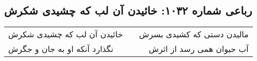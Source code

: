 \begin{center}
\section*{رباعی شماره ۱۰۳۲: خائیدن آن لب که چشیدی شکرش}
\label{sec:1032}
\begin{longtable}{l p{0.5cm} r}
خائیدن آن لب که چشیدی شکرش
&&
مالیدن دستی که کشیدی بسرش
\\
نگذارد آنکه او به جان و جگرش
&&
آب حیوان همی رسد از اثرش
\\
\end{longtable}
\end{center}
